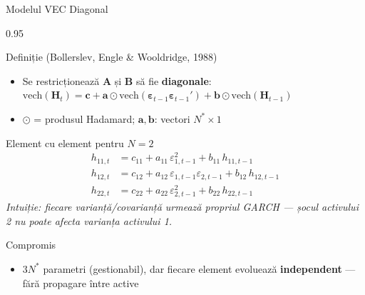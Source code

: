 \documentclass[9pt, aspectratio=169, t]{beamer}
\begin{document}
\begin{frame}{Modelul VEC Diagonal}
    \begin{cminipage}{0.95\textwidth}
    \vspace{-3mm}
    {\scriptsize
    \begin{block}{Definiție (Bollerslev, Engle \& Wooldridge, 1988)}
        \begin{itemize}\setlength{\itemsep}{0pt}
            \item Se restricționează $\mathbf{A}$ și $\mathbf{B}$ să fie \textbf{diagonale}: $\text{vech}(\mathbf{H}_t) = \mathbf{c} + \mathbf{a} \odot \text{vech}(\boldsymbol{\varepsilon}_{t-1}\boldsymbol{\varepsilon}_{t-1}') + \mathbf{b} \odot \text{vech}(\mathbf{H}_{t-1})$
            \item $\odot$ = produsul Hadamard; $\mathbf{a}, \mathbf{b}$: vectori $N^* \times 1$
        \end{itemize}
    \end{block}
    \vspace{-1mm}
    \begin{block}{Element cu element pentru $N=2$}
        \vspace{-1mm}
        \begin{align}
            h_{11,t} &= c_{11} + a_{11}\,\varepsilon_{1,t-1}^2 + b_{11}\,h_{11,t-1} \\
            h_{12,t} &= c_{12} + a_{12}\,\varepsilon_{1,t-1}\varepsilon_{2,t-1} + b_{12}\,h_{12,t-1} \\
            h_{22,t} &= c_{22} + a_{22}\,\varepsilon_{2,t-1}^2 + b_{22}\,h_{22,t-1}
        \end{align}
        \vspace{-3mm}
        \textit{Intuiție: fiecare varianță/covarianță urmează propriul GARCH --- șocul activului 2 nu poate afecta varianța activului 1.}
    \end{block}
    \vspace{-1mm}
    \begin{alertblock}{Compromis}
        \begin{itemize}\setlength{\itemsep}{0pt}
            \item $3N^*$ parametri (gestionabil), dar fiecare element evoluează \textbf{independent} --- fără propagare între active
        \end{itemize}
    \end{alertblock}
    }
    \end{cminipage}
\end{frame}
\end{document}
